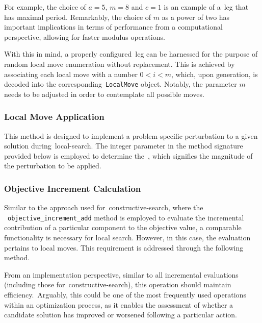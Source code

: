 For example, the choice of $a = 5$, $m = 8$ and $c = 1$ is an example of
a~\acrshort{lcg} that has maximal period. Remarkably, the choice of $m$ as a
power of two has important implications in terms of performance from a
computational perspective, allowing for faster modulus operations.

With this in mind, a properly configured~\acrshort{lcg} can be harnessed for the
purpose of random local move enumeration without replacement. This is achieved
by associating each local move with a number $0 < i < m$, which, upon
generation, is decoded into the corresponding~\texttt{LocalMove} object. Notably, the
parameter $m$ needs to be adjusted in order to contemplate all possible moves.

\subsubsection*{Local Move Application}

This method is designed to implement a problem-specific perturbation to a given
solution during~\acrshort{local-search}. The integer parameter in the method
signature provided below is employed to determine the~,
which signifies the magnitude of the perturbation to be applied.

\begin{center}
\end{center}

\subsubsection*{Objective Increment Calculation}

Similar to the approach used for~\acrshort{constructive-search}, where the
~\texttt{objective\_increment\_add} method is employed to evaluate the
incremental contribution of a particular component to the objective value, a
comparable functionality is necessary for local search. However, in this case,
the evaluation pertains to local moves. This requirement is addressed through
the following method.

\begin{center}
\end{center}

From an implementation perspective, similar to all incremental evaluations
(including those for~\acrshort{constructive-search}), this operation should
maintain efficiency.~Arguably, this could be one of the most frequently used
operations within an optimization process, as it enables the assessment of
whether a candidate solution has improved or worsened following a particular
action.

